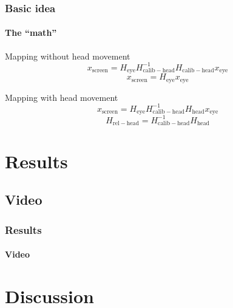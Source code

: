 \documentclass[%
14pt
]{beamer}
\begin{document}
\begin{frame}
	\frametitle{Basic idea}
  \framesubtitle{The ``math''}
  \begin{block}{Mapping without head movement}
    \begin{equation*}
      x_\mathrm{screen} = H_\mathrm{eye} H_\mathrm{calib-head} ^{-1} H_\mathrm{calib-head} x_\mathrm{eye}
    \end{equation*}
    \begin{equation*}
      x_\mathrm{screen} = H_\mathrm{eye}  x_\mathrm{eye}
    \end{equation*}
  \end{block}\pause
  \begin{block}{Mapping with head movement}
    \begin{equation*}
      x_\mathrm{screen} = H_\mathrm{eye} H_\mathrm{calib-head} ^{-1} H_\mathrm{head} x_\mathrm{eye}
    \end{equation*}
    \begin{equation*}
      H_\mathrm{rel-head} = H_\mathrm{calib-head}^{-1} H_\mathrm{head}
    \end{equation*}
  \end{block}
\end{frame}

\section{Results}
\subsection{Video}
\begin{frame}
	\frametitle{Results}
  \framesubtitle{Video}
\end{frame}

\section{Discussion}
\end{document}
